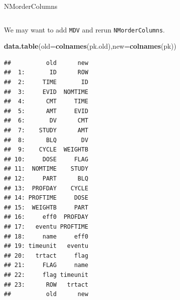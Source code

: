 \documentclass[
  8pt,
  ignorenonframetext,
  aspectratio=169]{beamer}
\newenvironment{Shaded}{\begin{snugshade}}{\end{snugshade}}
\newcommand{\DataTypeTok}[1]{\textcolor[rgb]{0.13,0.29,0.53}{#1}}
\newcommand{\KeywordTok}[1]{\textcolor[rgb]{0.13,0.29,0.53}{\textbf{#1}}}
\newcommand{\NormalTok}[1]{#1}
\begin{document}
\begin{frame}[fragile]{NMorderColumns}
\begin{columns}[T]
\begin{column}{0.48\textwidth}
\normalsize

We may want to add \texttt{MDV} and rerun \texttt{NMorderColumns}.
\footnotesize

\begin{Shaded}
\begin{Highlighting}[]
\KeywordTok{data.table}\NormalTok{(}\DataTypeTok{old=}\KeywordTok{colnames}\NormalTok{(pk.old),}\DataTypeTok{new=}\KeywordTok{colnames}\NormalTok{(pk))}
\end{Highlighting}
\end{Shaded}

\begin{verbatim}
##          old      new
##  1:       ID      ROW
##  2:     TIME       ID
##  3:     EVID  NOMTIME
##  4:      CMT     TIME
##  5:      AMT     EVID
##  6:       DV      CMT
##  7:    STUDY      AMT
##  8:      BLQ       DV
##  9:    CYCLE  WEIGHTB
## 10:     DOSE     FLAG
## 11:  NOMTIME    STUDY
## 12:     PART      BLQ
## 13:  PROFDAY    CYCLE
## 14: PROFTIME     DOSE
## 15:  WEIGHTB     PART
## 16:     eff0  PROFDAY
## 17:   eventu PROFTIME
## 18:     name     eff0
## 19: timeunit   eventu
## 20:   trtact     flag
## 21:     FLAG     name
## 22:     flag timeunit
## 23:      ROW   trtact
##          old      new
\end{verbatim}
\end{column}

\normalsize
\end{columns}
\end{frame}
\end{document}
